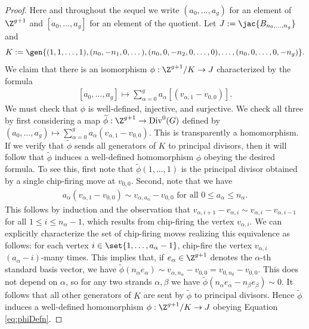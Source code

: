 \begin{proof}
\newcommand{\tphi}{\widetilde{\phi}}
    Here and throughout the sequel we write $(a_0,\dots,a_g)$ for an element of $\Z^{g+1}$ and $[a_0,\dots,a_g]$ for an element of the quotient. Let $J:= \jac{B_{n_0,\dots,n_g}}$ and $$K:=\gen{(1,1,\dots,1),(n_0,-n_1,0,\dots),(n_0,0,-n_2,0,\dots,0),\dots,(n_0,0,\dots,0,-n_g)}.$$ 
    We claim that there is an isomorphism $\phi:\Z^{g+1}/K \to J$ characterized by the formula 
     \begin{align} \label{eq:phiDefn}
        [a_0,\dots,a_g]\mapsto \sum_{\alpha = 0}^g a_\alpha [(v_{\alpha,1}-v_{0,0})].
    \end{align}
    We must check that $\phi$ is well-defined, injective, and surjective. We check all three by first considering a map 
    $\tphi: \Z^{g+1} \to \operatorname{Div}^0(G)$ defined by $(a_0, \ldots, a_g) \mapsto \sum_{\alpha=0}^g a_\alpha (v_{\alpha,1} - v_{0,0})$. This is transparently a homomorphism. If we verify that $\tphi$ sends all generators of $K$ to principal divisors, then it will follow that $\tphi$ induces a well-defined homomorphism $\phi$ obeying the desired formula. To see this, first note that $\tphi(1,\ldots,1)$ is the principal divisor obtained by a single chip-firing move at $v_{0,0}$. Second, note that we have
    \begin{align}\label{eq:multDiff}
    a_\alpha (v_{\alpha,1} - v_{0,0}) \sim v_{\alpha, a_\alpha} - v_{0,0} \mbox{ for all } 0 \leq a_\alpha \leq n_\alpha.
    \end{align}
    This follows by induction and the observation that $v_{\alpha,i+1} - v_{\alpha,i} \sim v_{\alpha,i} - v_{\alpha, i-1}$ for all $1 \leq i \leq n_\alpha-1$, which results from chip-firing the vertex $v_{\alpha,i}$. We can explicitly characterize the set of chip-firing moves realizing this equivalence as follows: for each vertex $i \in \set{1,\dots,a_\alpha-1}$, chip-fire the vertex $v_{\alpha,i}$ $(a_\alpha-i)$-many  times. This implies that, if $e_\alpha \in \Z^{g+1}$ denotes the $\alpha$-th standard basis vector, we have $\tphi(n_\alpha e_\alpha) \sim v_{\alpha, n_\alpha} - v_{0,0} = v_{0,n_0} - v_{0,0}$. This does not depend on $\alpha$, so for any two strands $\alpha, \beta$ we have $\tphi(n_\alpha e_\alpha - n_\beta e_\beta) \sim 0$. It follows that all other generators of $K$ are sent by $\tphi$ to principal divisors. Hence $\tphi$ induces a well-defined homomorphism $\phi: \Z^{g+1} / K \to J$ obeying Equation \eqref{eq:phiDefn}.
    

\end{proof}
